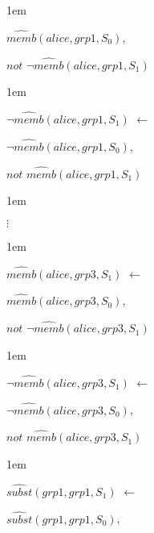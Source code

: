 \documentclass[glov2,twocolumn,final]{svjour2}
\newenvironment{vquote}
  {\begin{list}{}{\leftmargin 1em}\item[]}
  {\end{list}}
\begin{document}
\begin{enumerate}
\begin{vquote}
           \hspace{1em}
           $\hat{memb}(alice, grp1, S_{0})$,

           \hspace{1em}
           $not$ $\lnot\hat{memb}(alice, grp1, S_{1})$
         \end{vquote}

         \begin{vquote}
           $\lnot \hat{memb}(alice, grp1, S_{1})$ $\leftarrow$

           \hspace{1em}
           $\lnot\hat{memb}(alice, grp1, S_{0})$,

           \hspace{1em}
           $not$ $\hat{memb}(alice, grp1, S_{1})$
         \end{vquote}

         \begin{vquote}
           \hspace{2em}$\vdots$
         \end{vquote}

         \begin{vquote}
           $\hat{memb}(alice, grp3, S_{1})$ $\leftarrow$

           \hspace{1em}
           $\hat{memb}(alice, grp3, S_{0})$,

           \hspace{1em}
           $not$ $\lnot\hat{memb}(alice, grp3, S_{1})$
         \end{vquote}

         \begin{vquote}
           $\lnot\hat{memb}(alice, grp3, S_{1})$ $\leftarrow$

           \hspace{1em}
           $\lnot\hat{memb}(alice, grp3, S_{0})$,

           \hspace{1em}
           $not$ $\hat{memb}(alice, grp3, S_{1})$
         \end{vquote}

         \begin{vquote}
           $\hat{subst}(grp1, grp1, S_{1})$ $\leftarrow$

           \hspace{1em}
           $\hat{subst}(grp1, grp1, S_{0})$,


\end{vquote}
\end{enumerate}
\end{document}
